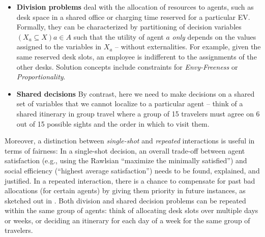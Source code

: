 \documentclass[german, a4paper, 11pt, oneside]{scrbook}
\begin{document}
\begin{itemize}
    \item \textbf{Division problems} deal with the allocation of resources to agents, such as desk space in a shared office or charging time reserved for a particular EV. Formally, they can be characterized by partitioning of decision variables $(X_a \subseteq X) {a \in A}$ such that the utility of agent $a$ \emph{only} depends on the values assigned to the variables in $X_a$ -- without externalities. For example, given the same reserved desk slots, an employee is indifferent to the assignments of the other desks. Solution concepts include constraints for \emph{Envy-Freeness} or \emph{Proportionality}.
    \item \textbf{Shared decisions} By contrast, here we need to make decisions on a shared set of variables that we cannot localize to a particular agent -- think of a shared itinerary in group travel where a group of 15 travelers must agree on 6 out of 15 possible sights and the order in which to visit them. 
\end{itemize}

Moreover, a distinction between \emph{single-shot} and \emph{repeated} interactions is useful in terms of fairness: In a single-shot decision, an overall trade-off between agent satisfaction (e.g., using the Rawlsian ``maximize the minimally satisfied'') and social efficiency (``highest average satisfaction'') needs to be found, explained, and justified. In a repeated interaction, there is a chance to compensate for past bad allocations (for certain agents) by giving them priority in future instances, as sketched out in \cite{Ek}.  Both division and shared decision problems can be repeated within the same group of agents: think of allocating desk slots over multiple days or weeks, or deciding an itinerary for each day of a week for the same group of travelers. 
\end{document}
